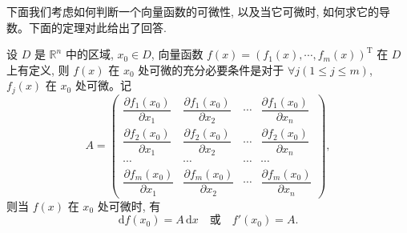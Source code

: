 下面我们考虑如何判断一个向量函数的可微性, 以及当它可微时, 如何求它的导数。下面的定理对此给出了回答.

\begin{theorem}\label{theorem:ma-14-1-4}
设 $D$ 是 $\mathbb R^n$ 中的区域, $x_0\in D$, 向量函数 $f(x)=(f_1(x),\cdots,f_m(x))^\mathrm T$ 在 $D$ 上有定义, 则 $f(x)$ 在 $x_0$ 处可微的充分必要条件是对于 $\forall j(1\leqslant j\leqslant m)$, $f_j(x)$ 在 $x_0$ 处可微。记
\[
  A=
  \begin{pmatrix}
    \dfrac{\partial f_1(x_0)}{\partial x_1}&\dfrac{\partial f_1(x_0)}{\partial x_2}&\cdots&\dfrac{\partial f_1(x_0)}{\partial x_n}\\
    \dfrac{\partial f_2(x_0)}{\partial x_1}&\dfrac{\partial f_2(x_0)}{\partial x_2}&\cdots&\dfrac{\partial f_2(x_0)}{\partial x_n}\\
    \cdots&\cdots&\cdots&\cdots\\
    \dfrac{\partial f_m(x_0)}{\partial x_1}&\dfrac{\partial f_m(x_0)}{\partial x_2}&\cdots&\dfrac{\partial f_m(x_0)}{\partial x_n}
  \end{pmatrix},
\]
则当 $f(x)$ 在 $x_0$ 处可微时, 有
\[
  \mathrm df(x_0)=A\,\mathrm dx\quad\text{或}\quad f'(x_0)=A.
\]
\end{theorem}


